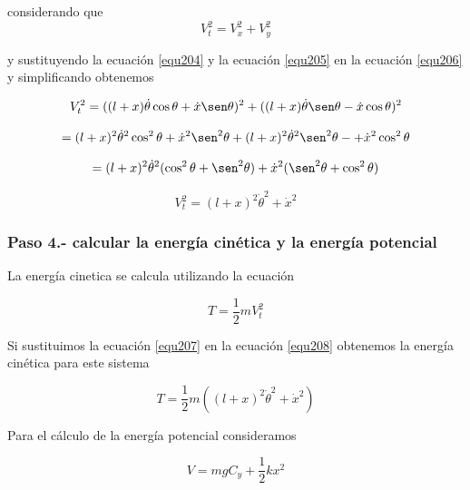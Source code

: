 \documentclass[12pt]{book}
\theoremstyle{definition}
\theoremstyle{remark}
\theoremstyle{plain}
\begin{document}
considerando que 
\begin{equation}
\label{equ206}
V_t ^2 = V_x ^2 + V_y ^2
\end{equation}

y sustituyendo la ecuación \ref{equ204} y la ecuación \ref{equ205} en la ecuación \ref{equ206} y simplificando obtenemos

\begin{equation*}
V_t ^2 = ( (l+x) \dot{\theta} \cos \theta+ \dot{x} \sen \theta  ) ^2 + ( (l+x) \dot{\theta} \sen \theta-  \dot{x} \cos \theta ) ^2
\end{equation*}

\begin{equation*}
=  (l+x)^2 \dot{\theta} ^2 \cos ^2 \theta+ \dot{x} ^2 \sen ^2 \theta  +  (l+x) ^2 \dot{\theta} ^2 \sen ^2 \theta-+ \dot{x} ^2 \cos ^2 \theta
\end{equation*}

\begin{equation*}
=  (l+x)^2 \dot{\theta} ^2 ( \cos ^2 \theta+  \sen ^2 \theta)+ \dot{x} ^2 ( \sen ^2 \theta+ \cos ^2 \theta)
\end{equation*}


\begin{equation}
\label{equ207}
V_t ^2=  (l+x)^2 \dot{\theta} ^2 + \dot{x} ^2 
\end{equation}

\subsubsection{Paso 4.- calcular la energía cinética y la energía potencial}
La energía cinetica se calcula utilizando la ecuación

\begin{equation}
\label{equ208}
T = \frac{1}{2}m V_t ^2
\end{equation}

Si sustituimos la ecuación \ref{equ207} en la ecuación \ref{equ208} obtenemos la energía cinética para este sistema

\begin{equation}
\label{equ209}
T = \frac{1}{2}m (  (l+x)^2 \dot{\theta} ^2 +\dot{x} ^2 )
\end{equation}

Para el cálculo de la energía potencial consideramos 

\begin{equation}
\label{equ210}
V = m g C_y +\frac{1}{2} k x^2
\end{equation}
 
\end{document}

